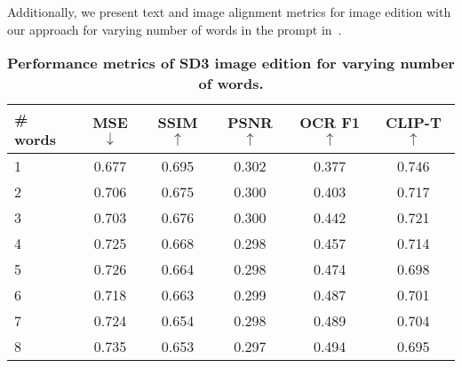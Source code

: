 Additionally, we present text and image alignment metrics for image edition with our approach for varying number of words in the prompt in~.

\begin{table}[ht]
    \centering
    \caption{\textbf{Performance metrics of SD3 image edition for varying number of words.}}
    \begin{tabular}{l||c|c|c|c|c}
        \toprule
        \textbf{\# words} & \textbf{MSE $\downarrow$} & \textbf{SSIM $\uparrow$} & \textbf{PSNR $\uparrow$} & \textbf{OCR F1 $\uparrow$} & \textbf{CLIP-T $\uparrow$} \\
        \hline
        1                 & 0.677                     & 0.695                    & 0.302                    & 0.377                      & 0.746                      \\
        2                 & 0.706                     & 0.675                    & 0.300                    & 0.403                      & 0.717                      \\
        3                 & 0.703                     & 0.676                    & 0.300                    & 0.442                      & 0.721                      \\
        4                 & 0.725                     & 0.668                    & 0.298                    & 0.457                      & 0.714                      \\
        5                 & 0.726                     & 0.664                    & 0.298                    & 0.474                      & 0.698                      \\
        6                 & 0.718                     & 0.663                    & 0.299                    & 0.487                      & 0.701                      \\
        7                 & 0.724                     & 0.654                    & 0.298                    & 0.489                      & 0.704                      \\
        8                 & 0.735                     & 0.653                    & 0.297                    & 0.494                      & 0.695                      \\
        \bottomrule
    \end{tabular}
    \label{tab:metrics_words}
\end{table}



